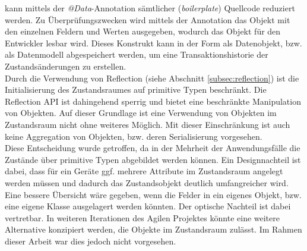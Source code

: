    kann mittels der \textit{@Data}-Annotation sämtlicher (\textit{boilerplate}) Quellcode reduziert werden. Zu Überprüfungszwecken wird mittels der Annotation das Objekt mit den einzelnen 
    Feldern und Werten ausgegeben, wodurch das Objekt für den Entwickler lesbar wird. Dieses Konstrukt kann in der Form als Datenobjekt, bzw. als Datenmodell abgespeichert werden, um eine 
    Transaktionshistorie der Zustandsänderungen zu erstellen.
    \\
    \linebreak
    Durch die Verwendung von Reflection (siehe Abschnitt \ref{subsec:reflection}) ist die Initialisierung des Zustandsraumes auf primitive Typen beschränkt. 
    Die Reflection \acs{API} ist dahingehend sperrig und bietet eine beschränkte Manipulation von Objekten. Auf dieser Grundlage ist eine Verwendung von Objekten im 
    Zustandsraum nicht ohne weiteres Möglich. Mit dieser Einschränkung ist auch keine Aggregation von 
    Objekten, bzw. deren Serialisierung vorgesehen. 
    \\
    Diese Entscheidung wurde getroffen, da in der Mehrheit der Anwendungsfälle die Zustände über primitive Typen abgebildet werden können. 
    Ein Designnachteil ist dabei, dass für ein Geräte ggf. mehrere Attribute im Zustandsraum angelegt werden müssen und dadurch das Zustandsobjekt 
    deutlich umfangreicher wird. Eine bessere Übersicht wäre gegeben, wenn die Felder in ein eigenes Objekt, bzw. eine eigene Klasse ausgelagert werden könnten. 
    Der optische Nachteil ist dabei vertretbar. In weiteren Iterationen des Agilen Projektes könnte eine weitere Alternative konzipiert werden, die Objekte 
    im Zustandsraum zulässt. Im Rahmen dieser Arbeit war dies jedoch nicht vorgesehen. 



